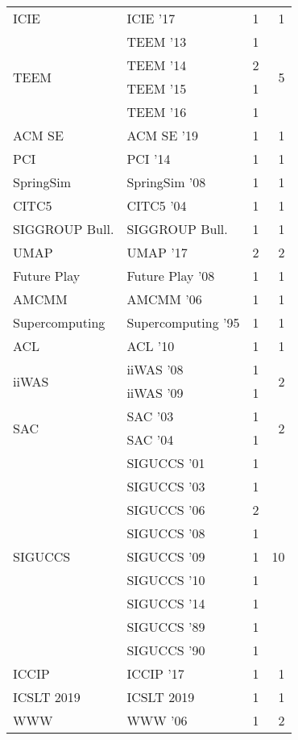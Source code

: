 \begin{table*}[t]
\begin{tabular}{llrr}
\multirow{1}{*}{ICIE } & ICIE '17 & 1 & \multirow{1}{*}{1}\\
\multirow{4}{*}{TEEM } & TEEM '13 & 1 & \multirow{4}{*}{5}\\
& TEEM '14 & 2 &\\
& TEEM '15 & 1 &\\
& TEEM '16 & 1 &\\
\multirow{1}{*}{ACM SE } & ACM SE '19 & 1 & \multirow{1}{*}{1}\\
\multirow{1}{*}{PCI } & PCI '14 & 1 & \multirow{1}{*}{1}\\
\multirow{1}{*}{SpringSim } & SpringSim '08 & 1 & \multirow{1}{*}{1}\\
\multirow{1}{*}{CITC5 } & CITC5 '04 & 1 & \multirow{1}{*}{1}\\
\multirow{1}{*}{SIGGROUP Bull.} & SIGGROUP Bull. & 1 & \multirow{1}{*}{1}\\
\multirow{1}{*}{UMAP } & UMAP '17 & 2 & \multirow{1}{*}{2}\\
\multirow{1}{*}{Future Play } & Future Play '08 & 1 & \multirow{1}{*}{1}\\
\multirow{1}{*}{AMCMM } & AMCMM '06 & 1 & \multirow{1}{*}{1}\\
\multirow{1}{*}{Supercomputing } & Supercomputing '95 & 1 & \multirow{1}{*}{1}\\
\multirow{1}{*}{ACL } & ACL '10 & 1 & \multirow{1}{*}{1}\\
\multirow{2}{*}{iiWAS } & iiWAS '08 & 1 & \multirow{2}{*}{2}\\
& iiWAS '09 & 1 &\\
\multirow{2}{*}{SAC } & SAC '03 & 1 & \multirow{2}{*}{2}\\
& SAC '04 & 1 &\\
\multirow{9}{*}{SIGUCCS } & SIGUCCS '01 & 1 & \multirow{9}{*}{10}\\
& SIGUCCS '03 & 1 &\\
& SIGUCCS '06 & 2 &\\
& SIGUCCS '08 & 1 &\\
& SIGUCCS '09 & 1 &\\
& SIGUCCS '10 & 1 &\\
& SIGUCCS '14 & 1 &\\
& SIGUCCS '89 & 1 &\\
& SIGUCCS '90 & 1 &\\
\multirow{1}{*}{ICCIP } & ICCIP '17 & 1 & \multirow{1}{*}{1}\\
\multirow{1}{*}{ICSLT 2019} & ICSLT 2019 & 1 & \multirow{1}{*}{1}\\
\multirow{2}{*}{WWW } & WWW '06 & 1 & \multirow{2}{*}{2}\\

\end{tabular}
\end{table*}
